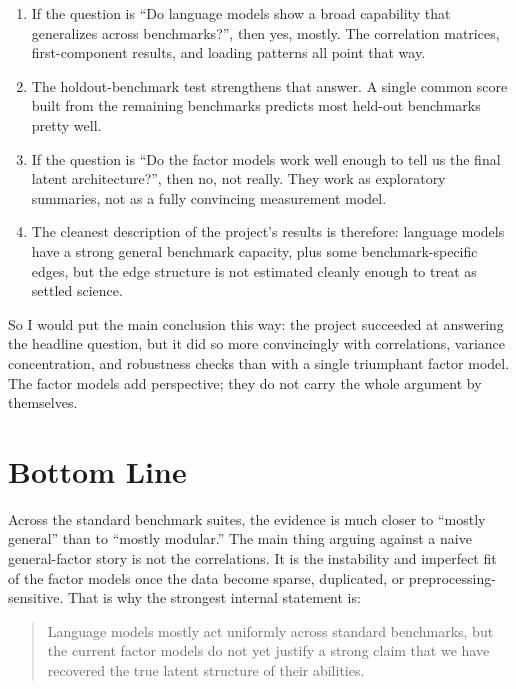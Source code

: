 \documentclass[11pt]{article}
\begin{document}
\begin{enumerate}
\item If the question is ``Do language models show a broad capability that generalizes across benchmarks?'', then yes, mostly. The correlation matrices, first-component results, and loading patterns all point that way.
\item The holdout-benchmark test strengthens that answer. A single common score built from the remaining benchmarks predicts most held-out benchmarks pretty well.
\item If the question is ``Do the factor models work well enough to tell us the final latent architecture?'', then no, not really. They work as exploratory summaries, not as a fully convincing measurement model.
\item The cleanest description of the project's results is therefore: language models have a strong general benchmark capacity, plus some benchmark-specific edges, but the edge structure is not estimated cleanly enough to treat as settled science.
\end{enumerate}

So I would put the main conclusion this way: the project succeeded at answering the headline question, but it did so more convincingly with correlations, variance concentration, and robustness checks than with a single triumphant factor model. The factor models add perspective; they do not carry the whole argument by themselves.

\section{Bottom Line}
Across the standard benchmark suites, the evidence is much closer to ``mostly general'' than to ``mostly modular.'' The main thing arguing against a naive general-factor story is not the correlations. It is the instability and imperfect fit of the factor models once the data become sparse, duplicated, or preprocessing-sensitive. That is why the strongest internal statement is:

\begin{quote}
Language models mostly act uniformly across standard benchmarks, but the current factor models do not yet justify a strong claim that we have recovered the true latent structure of their abilities.
\end{quote}
\end{document}
